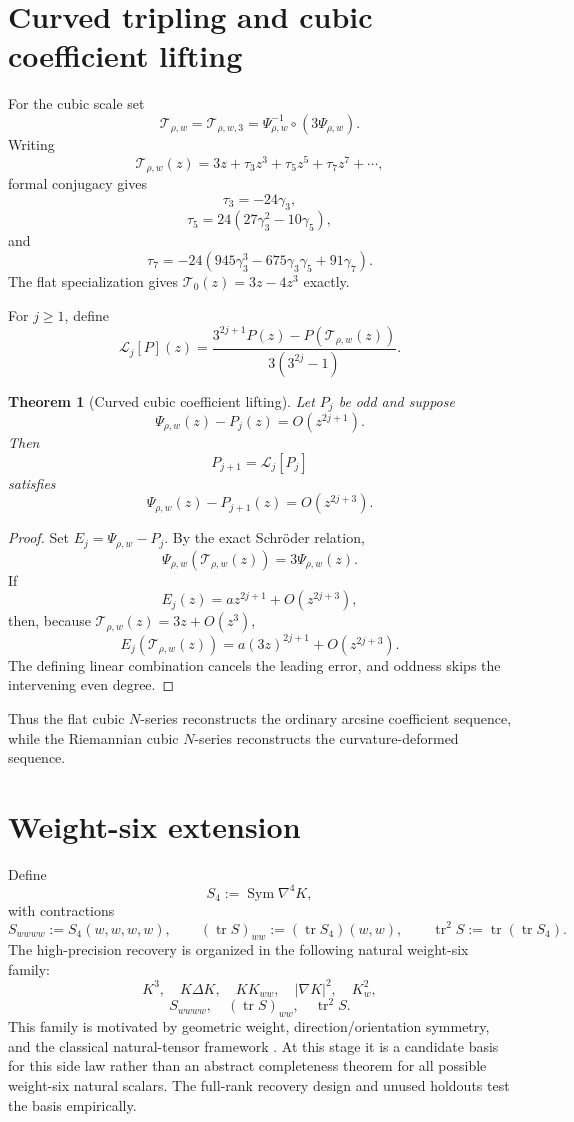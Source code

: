 \documentclass[11pt]{article}
\newtheorem{theorem}{Theorem}[section]
\theoremstyle{definition}
\theoremstyle{remark}
\newcommand{\cT}{\mathcal{T}}
\newcommand{\Sym}{\operatorname{Sym}}
\newcommand{\tr}{\operatorname{tr}}
\begin{document}
\section{Curved tripling and cubic coefficient lifting}
\label{sec:lifting}

For the cubic scale set
\[
\cT_{\rho,w}
=
\cT_{\rho,w,3}
=
\Psi_{\rho,w}^{-1}\circ(3\Psi_{\rho,w}).
\]
Writing
\[
\cT_{\rho,w}(z)
=
3z+\tau_3z^3+\tau_5z^5+\tau_7z^7+\cdots,
\]
formal conjugacy gives
\[
\boxed{\tau_3=-24\gamma_3,}
\]
\[
\boxed{\tau_5=24(27\gamma_3^2-10\gamma_5),}
\]
and
\[
\boxed{
\tau_7
=-24(945\gamma_3^3-675\gamma_3\gamma_5+91\gamma_7).
}
\]
The flat specialization gives \(\cT_0(z)=3z-4z^3\) exactly.

For \(j\ge1\), define
\[
\mathscr L_j[P](z)
=
\frac{3^{2j+1}P(z)-P(\cT_{\rho,w}(z))}
{3(3^{2j}-1)}.
\]

\begin{theorem}[Curved cubic coefficient lifting]
\label{thm:curved-lifting}
Let \(P_j\) be odd and suppose
\[
\Psi_{\rho,w}(z)-P_j(z)=O(z^{2j+1}).
\]
Then
\[
P_{j+1}=\mathscr L_j[P_j]
\]
satisfies
\[
\Psi_{\rho,w}(z)-P_{j+1}(z)=O(z^{2j+3}).
\]
\end{theorem}

\begin{proof}
Set \(E_j=\Psi_{\rho,w}-P_j\).  By the exact Schr\"oder relation,
\[
\Psi_{\rho,w}(\cT_{\rho,w}(z))=3\Psi_{\rho,w}(z).
\]
If
\[
E_j(z)=az^{2j+1}+O(z^{2j+3}),
\]
then, because \(\cT_{\rho,w}(z)=3z+O(z^3)\),
\[
E_j(\cT_{\rho,w}(z))
=a(3z)^{2j+1}+O(z^{2j+3}).
\]
The defining linear combination cancels the leading error, and oddness skips
the intervening even degree.
\end{proof}

Thus the flat cubic \(N\)-series reconstructs the ordinary arcsine coefficient
sequence, while the Riemannian cubic \(N\)-series reconstructs the
curvature-deformed sequence.

\section{Weight-six extension}
\label{sec:weight-six}

Define
\[
S_4:=\Sym\nabla^4K,
\]
with contractions
\[
S_{wwww}:=S_4(w,w,w,w),
\qquad
(\tr S)_{ww}:=(\tr S_4)(w,w),
\qquad
\tr^2S:=\tr(\tr S_4).
\]
The high-precision recovery is organized in the following natural
weight-six family:
\[
K^3,\quad K\Delta K,\quad KK_{ww},\quad |\nabla K|^2,\quad K_w^2,
\]
\[
S_{wwww},\quad (\tr S)_{ww},\quad \tr^2S.
\]
This family is motivated by geometric weight, direction/orientation symmetry,
and the classical natural-tensor framework \cite{GrahamKuo2026}.  At this
stage it is a candidate basis for this side law rather than an abstract
completeness theorem for all possible weight-six natural scalars.  The
full-rank recovery design and unused holdouts test the basis empirically.
\end{document}

